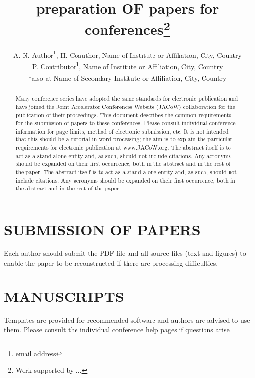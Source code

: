 



\title{preparation OF papers for  conferences\thanks{Work supported by ...}}

\author{A. N. Author\thanks{email address}, H. Coauthor, Name of Institute or Affiliation, City, Country \\
		P. Contributor\textsuperscript{1}, Name of Institute or Affiliation, City, Country \\
		\textsuperscript{1}also at Name of Secondary Institute or Affiliation, City, Country}
	
\maketitle

%
\begin{abstract}
   Many conference series have adopted the same standards
   for electronic publication and have joined the Joint
   Accelerator Conferences Website (JACoW) collaboration
   for the publication of their proceedings. This document
   describes the common requirements for the submission of
   papers to these conferences. Please consult individual
   conference information for page limits, method of electronic
   submission, etc. It is not intended that this should
   be a tutorial in word processing; the aim is to explain the
   particular requirements for electronic publication at
   www.JACoW.org. The abstract itself is to act as a stand-alone
   entity and, as such, should not include citations. Any acronyms 
   should be expanded on their first occurrence, both in the 
   abstract and in the rest of the paper. 
   The abstract itself is to act as a stand-alone entity and, 
   as such, should not include citations. Any acronyms should 
   be expanded on their first occurrence, both in the abstract 
   and in the rest of the paper.
\end{abstract}


\section{SUBMISSION OF PAPERS}
Each author should submit the PDF file and all source
files (text and figures) to enable the paper to be
reconstructed if there are processing difficulties.

\section{MANUSCRIPTS}
Templates are provided for recommended software and
authors are advised to use them. Please consult the
individual conference help pages if questions arise.

